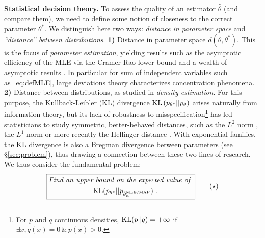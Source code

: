 \documentclass[twoside]{article}
\newcommand{\nat}{\theta}
\begin{document}
{\bf Statistical decision theory.}
To assess the quality of an estimator $\hat \nat$ (and compare them), we need to define some notion of closeness to the correct parameter $\nat^*$.
We distinguish here two ways: \textit{distance in parameter space} and \textit{``distance'' between distributions}.
{\bf 1)} Distance in parameter space $d(\nat,\nat^*)$. This is the focus of \emph{parameter estimation}, yielding results such as the asymptotic efficiency of the MLE via the Cramer-Rao lower-bound \citep{aitken1942estimation} and a wealth of asymptotic results \citep{vdv1998asymptotic}.
In particular for sum of independent variables such as~\eqref{eq:defMLE}, large deviations theory \citep{varadhan1984large} characterizes concentration phenomena.
{\bf 2)} Distance between distributions, as studied in \emph{density estimation}.
For this purpose, the Kullback-Leibler (KL) divergence $\KL\paren{p_{\nat^*} || p_{\nat} }$  arises naturally from information theory,
but its lack of robustness to misspecification\footnote{
For $p$ and $q$ continuous densities,
$\mathrm{KL}(p||q) = +\infty$ if $\exists x, q(x)=0 \, \& \, p(x)>0$.
}
has led statisticians to study symmetric, better-behaved distances, such as the $L^2$ norm \citep[\S1.2]{tsybakov2009introduction}, the $L^1$ norm \citep{devroye2001combinatorial} or more recently the Hellinger distance \citep{baraud2017new}.
With exponential families, the KL divergence is also a Bregman divergence between parameters (see \S\ref{sec:problem}), thus drawing a connection between these two lines of research.
We thus consider the fundamental problem:
\begin{equation}
\boxed{
\begin{aligned}
	\textit{Find an upper}&\textit{ bound on the expected value of } \\
	&\KL(p_{\nat^*} || p_{\hat \nat_n^\text{MLE/MAP} }) \; .
\end{aligned}
}
\tag{$\star$}
\label{problem}
\end{equation}
\end{document}
